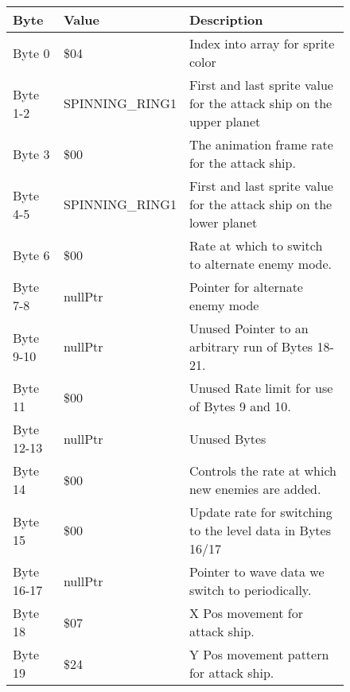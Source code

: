 \begin{figure}[H]
  {
  \setlength{\tabcolsep}{3.0pt}
  \setlength\cmidrulewidth{\heavyrulewidth} %
  \begin{adjustbox}{width=12cm}

\begin{tabular}{lll}
\toprule
 Byte       & Value                     & Description                                                         \\
\midrule
 Byte 0     & \$04                       & Index into array for sprite color                                   \\
 Byte 1-2   & SPINNING\_RING1            & First and last sprite value for the attack ship on the upper planet \\
 Byte 3     & \$00                       & The animation frame rate for the attack ship.                       \\
 Byte 4-5   & SPINNING\_RING1            & First and last sprite value for the attack ship on the lower planet \\
 Byte 6     & \$00                       & Rate at which to switch to alternate enemy mode.                    \\
 Byte 7-8   & nullPtr                   & Pointer for alternate enemy mode                                    \\
 Byte 9-10  & nullPtr                   & Unused Pointer to an arbitrary run of Bytes 18-21.                  \\
 Byte 11    & \$00                       & Unused Rate limit for use of Bytes 9 and 10.                        \\
 Byte 12-13 & nullPtr                   & Unused Bytes                                                        \\
 Byte 14    & \$00                       & Controls the rate at which new enemies are added.                   \\
 Byte 15    & \$00                       & Update rate for switching to the level data in Bytes 16/17          \\
 Byte 16-17 & nullPtr                   & Pointer to wave data we switch to periodically.                     \\
 Byte 18    & \$07                       & X Pos movement for attack ship.                                     \\
 Byte 19    & \$24                       & Y Pos movement pattern for attack ship.                             \\

\end{tabular}
\end{adjustbox}}
\end{figure}

